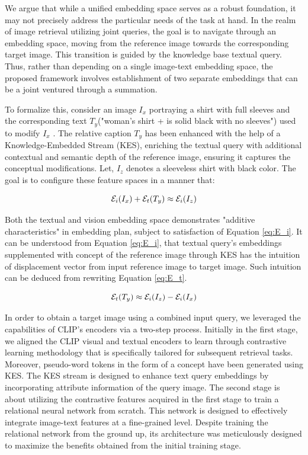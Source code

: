 \documentclass[10pt,lineno]{wlpeerj}
\begin{document}
We argue that while a unified embedding space serves as a robust foundation, it may not precisely address the particular needs of the task at hand. In the realm of image retrieval utilizing joint queries, the goal is to navigate through an embedding space, moving from the reference image towards the corresponding target image. This transition is guided by the knowledge base textual query. Thus, rather than depending on a single image-text embedding space, the proposed framework involves establishment of two separate embeddings that can be a joint ventured through a summation.

 To formalize this, consider an image $I_x$ portraying a shirt with full sleeves and the corresponding text $T_y$("woman's shirt + is solid black with no sleeves") used to modify $I_x$ . The relative caption $T_y$ has been enhanced with the help of a Knowledge-Embedded Stream (KES), enriching the textual query with additional contextual and semantic depth of the reference image, ensuring it captures the conceptual modifications. Let, $I_z$ denotes a sleeveless shirt with black color. The goal is to configure these feature spaces in a manner that:

\begin{equation}
    \centering
    \mathcal{E}_i(I_x) + \mathcal{E}_t(T_y) \approx \mathcal{E}_i(I_z)
\label{eq:E_i}
\end{equation}

Both the textual and vision embedding space demonstrates "additive characteristics" in embedding plan, subject to satisfaction of Equation \ref{eq:E_i}.  It can be understood from Equation \ref{eq:E_i}, that textual query's embeddings supplemented with concept of the reference image through KES has the intuition of displacement vector from input reference image to target image. Such intuition can be deduced from rewriting Equation \ref{eq:E_t}.

\begin{equation}
    \centering
    \mathcal{E}_t(T_y)  \approx \mathcal{E}_i(I_z) - \mathcal{E}_i(I_x)
\label{eq:E_t}
\end{equation}

In order to obtain a target image using a combined input query, we leveraged the capabilities of CLIP's encoders via a two-step process. Initially in the first stage, we aligned the CLIP visual and textual encoders to learn through contrastive learning methodology that is specifically tailored for subsequent retrieval tasks. Moreover, pseudo-word tokens in the form of a concept have been generated using KES. The KES stream is designed to enhance text query embeddings by incorporating attribute information of the query image.
The second stage is about utilizing the contrastive features acquired in the first stage to train a relational neural network from scratch. This network is designed to effectively integrate image-text features at a fine-grained level. Despite training the relational network from the ground up, its architecture was meticulously designed to maximize the benefits obtained from the initial training stage.
\end{document}
